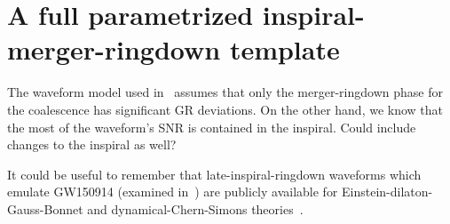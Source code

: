 \documentclass[aps,10pt,preprint,
               notitlepage,onecolumn,superscriptaddress,
               eqsecnum,
               nofootinbib,tightenlines,floatfix]{revtex4-1}
\begin{document}
\section{A full parametrized inspiral-merger-ringdown template}

The waveform model used in~\cite{Brito:2018rfr,Ghosh:2021mrv} assumes that
only the merger-ringdown phase for the coalescence has significant GR deviations.
%
On the other hand, we know that the most of the waveform's SNR is contained in the
inspiral.
%
Could include changes to the inspiral as well?

It could be useful to remember that late-inspiral-ringdown waveforms which emulate
GW150914 (examined in~\cite{Ghosh:2021mrv}) are publicly available for
Einstein-dilaton-Gauss-Bonnet and dynamical-Chern-Simons
theories~\cite{Okounkova:2019zjf,Okounkova:2020rqw}.




\end{document}
